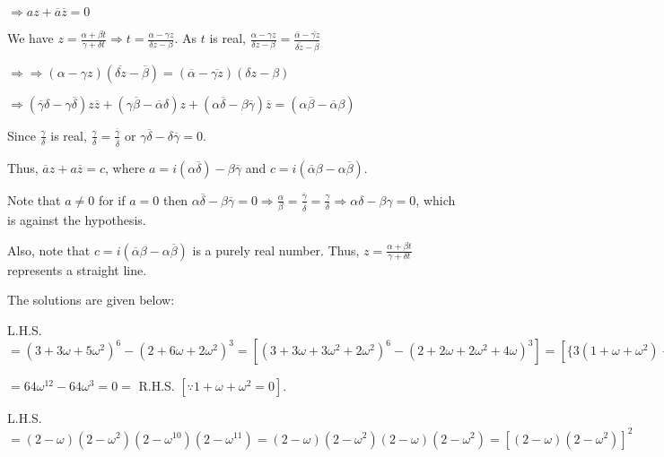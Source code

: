   $\Rightarrow az + \overline{a}\overline{z} = 0$
\item We have $z = \frac{\alpha + \beta t}{\gamma + \delta t} \Rightarrow t = \frac{\alpha - \gamma
  z}{\delta z - \beta}$. As $t$ is real, $\frac{\alpha - \gamma z}{\delta z - \beta} =
  \frac{\overline{\alpha} - \overline{\gamma z}}{\overline{\delta z} - \overline{\beta}}$

  $\Rightarrow \Rightarrow (\alpha - \gamma z)(\overline{\delta z} - \overline{\beta}) = (\overline{\alpha}
  - \overline{\gamma z})(\delta z - \beta)$

  $\Rightarrow (\overline{\gamma}\delta - \gamma\overline{\delta})z\overline{z} +
  (\gamma\overline{\beta}-\overline{\alpha}\delta)z +(\alpha\overline{\delta} -
  \beta\overline{\gamma})\overline{z} = (\alpha\overline{\beta} - \overline{\alpha}\beta)$

  Since $\frac{\gamma}{\delta}$ is real, $\frac{\gamma}{\delta} =
  \frac{\overline{\gamma}}{\overline{\delta}}$ or $\gamma\overline{\delta} - \delta\overline{\gamma} = 0$.

  Thus, $\overline{a}z + a\overline{z} = c$, where $a = i(\alpha\overline{\delta}) - \beta\overline{\gamma}$
  and $c = i(\overline{\alpha}\beta - \alpha\overline{\beta})$.

  Note that $a \ne 0$ for if $a = 0$ then $\alpha\overline{\delta} - \beta\overline{\gamma} = 0\Rightarrow
  \frac{\alpha}{\beta} = \frac{\overline{\gamma}}{\overline{\delta}} = \frac{\gamma}{\delta}\Rightarrow
  \alpha\delta - \beta\gamma = 0$, which is against the hypothesis.

  Also, note that $c = i(\overline{\alpha}\beta - \alpha\overline{\beta})$ is a purely real number. Thus, $z
  = \frac{\alpha + \beta t}{\gamma + \delta t}$ represents a straight line.
\item The solutions are given below:
  \startitemize[i]
  \item L.H.S. $= (3 + 3\omega + 5\omega^2)^6 - (2 + 6\omega + 2\omega^2)^3 = [(3 + 3\omega + 3\omega^2 +
    2\omega^2)^6 - (2 + 2\omega + 2\omega^2 + 4\omega)^3] = [\{3(1 + \omega + \omega^2) + 2\omega^2\}^6] -
    [\{2(1 + \omega + \omega^2) + 4\omega\}^3]$

    $= 64\omega^{12} - 64\omega^3 = 0 =$ R.H.S. $[\because 1 + \omega + \omega^2 = 0]$.
  \item L.H.S. $= (2 - \omega)(2 - \omega^2)(2 - \omega^{10})(2 - \omega^{11}) = (2 - \omega)(2 -
    \omega^2)(2 - \omega)(2 - \omega^2) = [(2 - \omega)(2 - \omega^2)]^2$

